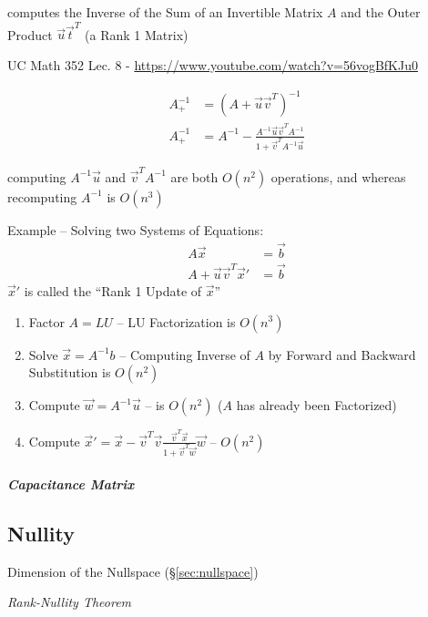 computes the Inverse of the Sum of an Invertible Matrix $A$ and the Outer
Product $\vec{u}\vec{t}^T$ (a Rank 1 Matrix)

UC Math 352 Lec. 8 - \url{https://www.youtube.com/watch?v=56vogBfKJu0}

\begin{align*}
  A_+^{-1} & = (A + \vec{u}\vec{v}^T)^{-1} \\
  A_+^{-1} & = A^{-1} -
    \frac{A^{-1}\vec{u}\vec{v}^TA^{-1}}{1 + \vec{v}^TA^{-1}\vec{u}}
\end{align*}

computing $A^{-1}\vec{u}$ and $\vec{v}^TA^{-1}$ are both $O(n^2)$ operations,
and whereas recomputing $A^{-1}$ is $O(n^3)$

\asterism

Example -- Solving two Systems of Equations:
\begin{align*}
  A\vec{x}                     & = \vec{b} \\
  A + \vec{u}\vec{v}^T\vec{x}' & = \vec{b}
\end{align*}
$\vec{x}'$ is called the ``Rank 1 Update of $\vec{x}$''

\begin{enumerate}
  \item Factor $A = LU$ -- LU Factorization is $O(n^3)$
  \item Solve $\vec{x} = A^{-1}b$ -- Computing Inverse of $A$ by Forward and
    Backward Substitution is $O(n^2)$
  \item Compute $\vec{w} = A^{-1}\vec{u}$ -- is $O(n^2)$ ($A$ has already been
    Factorized)
  \item Compute
    $\vec{x}' = \vec{x} - \vec{v}^T\vec{v}
      \frac{\vec{v}^T\vec{x}}{1 + \vec{v}^T\vec{w}} \vec{w}$ -- $O(n^2)$
\end{enumerate}



\subparagraph{Capacitance Matrix}\label{sec:capacitance_matrix}\hfill



\subsection{Nullity}\label{sec:nullity}

Dimension of the Nullspace (\S\ref{sec:nullspace})

\emph{Rank-Nullity Theorem}


